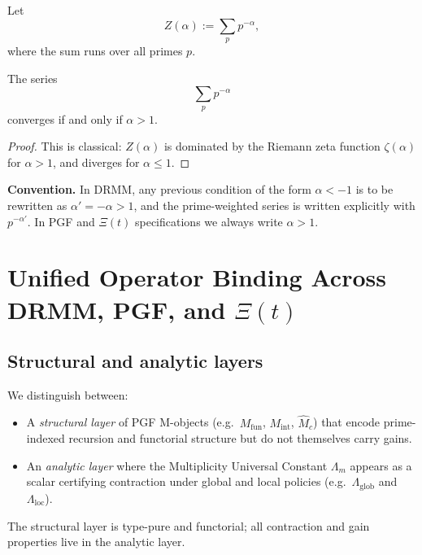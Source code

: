 \documentclass[11pt]{article}
\begin{document}
\begin{definition}\label{def:prime-zeta}
Let
\[
Z(\alpha) := \sum_{p} p^{-\alpha},
\]
where the sum runs over all primes $p$.
\end{definition}

\begin{lemma}\label{lem:prime-zeta-convergence}
The series
\[
\sum_{p} p^{-\alpha}
\]
converges if and only if $\alpha > 1$.
\end{lemma}

\begin{proof}
This is classical: $Z(\alpha)$ is dominated by the Riemann zeta function
$\zeta(\alpha)$ for $\alpha > 1$, and diverges for $\alpha \le 1$.
\end{proof}

\noindent
\textbf{Convention.} In DRMM, any previous condition of the form $\alpha < -1$ is
to be rewritten as $\alpha' = -\alpha > 1$, and the prime-weighted series is
written explicitly with $p^{-\alpha'}$. In PGF and $\Xi(t)$ specifications we
always write $\alpha > 1$.

\section{Unified Operator Binding Across DRMM, PGF, and $\Xi(t)$}

\subsection{Structural and analytic layers}

We distinguish between:

\begin{itemize}
    \item A \emph{structural layer} of PGF M-objects (e.g.\ $M_{\mathrm{fun}}$,
    $M_{\mathrm{int}}$, $\widehat{M}_c$) that encode prime-indexed recursion
    and functorial structure but do not themselves carry gains.
    \item An \emph{analytic layer} where the Multiplicity Universal Constant
    $\Lambda_m$ appears as a scalar certifying contraction under global and local
    policies (e.g.\ $\Lambda_{\mathrm{glob}}$ and $\Lambda_{\mathrm{loc}}$).
\end{itemize}

The structural layer is type-pure and functorial; all contraction and gain
properties live in the analytic layer.
\end{document}
